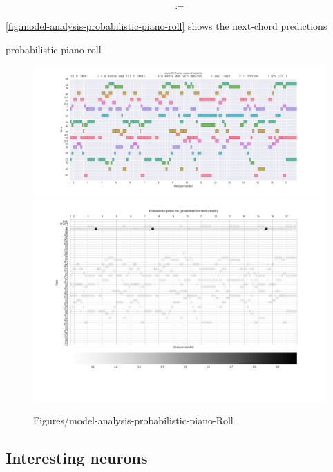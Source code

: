 \documentclass[dissertation.tex]{subfiles}
\begin{document}
\begin{equation}
     \coloneqq
\end{equation}

\autoref{fig:model-analysis-probabilistic-piano-roll} shows the next-chord
predictions

probabilistic piano
roll

\begin{figure}[htpb]
    \centering
    \includegraphics[width=1.0\linewidth]{Figures/model-analysis-input-piano-roll.png}
    \includegraphics[trim={0 0 0 1.4cm},clip,width=0.995\linewidth]{Figures/model-analysis-probabilistic-piano-roll.png}
    \caption{Figures/model-analysis-probabilistic-piano-Roll}
    \label{fig:model-analysis-probabilistic-piano-roll}
\end{figure}

\subsection{Interesting neurons}
\end{document}
